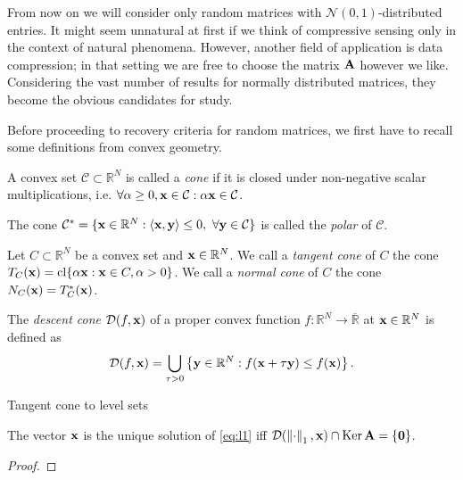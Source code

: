 From now on we will consider only random matrices with $\mathcal{N}(0,1)$-distributed entries.
It might seem unnatural at first if we think of compressive sensing only in the context of natural phenomena.
However, another field of application is data compression; in that setting we are free to choose the matrix $\mathbf{A}$ however we like.
Considering the vast number of results for normally distributed matrices, they become the obvious candidates for study.

Before proceeding to recovery criteria for random matrices, we first have to recall some definitions from convex geometry.

\begin{definition}
    A convex set $\mathcal{C} \subset \mathbb{R}^N$ is called a \textit{cone} if it is closed under non-negative scalar multiplications, i.e.
    $\forall \alpha \geq 0, \mathbf{x} \in \mathcal{C}: \alpha \mathbf{x} \in \mathcal{C}$.

    The cone $\mathcal{C}^* = \{ \mathbf{x} \in \mathbb{R}^N : \left< \mathbf{x}, \mathbf{y} \right> \leq 0, \ \forall \mathbf{y} \in \mathcal{C} \}$
    is called the \textit{polar} of $\mathcal{C}$.
\end{definition}

\begin{definition}
    Let $C \subset \mathbb{R}^N$ be a convex set and $\mathbf{x} \in \mathbb{R}^N$.
    We call a \textit{tangent cone} of $C$ the cone $T_C(\mathbf{x}) = \operatorname{cl}\{\alpha\mathbf{x}: \mathbf{x} \in C, \alpha > 0  \} $.
    We call a \textit{normal cone} of $C$ the cone $N_C(\mathbf{x}) = T_C^*(\mathbf{x})$.
\end{definition}

\begin{definition}
    The \textit{descent cone} $\mathcal{D}(f, \mathbf{x}) $ of a proper convex function $f: \mathbb{R}^N \rightarrow \overline{\mathbb{R}}$
    at $\mathbf{x} \in \mathbb{R}^N$ is defined as $$\mathcal{D}(f, \mathbf{x}) = \bigcup_{\tau > 0} \left\{ \mathbf{y} \in \mathbb{R}^N: f(\mathbf{x}+\tau \mathbf{y}) \leq f(\mathbf{x}) \right\}. $$
\end{definition}

\begin{remark}
    Tangent cone to level sets
\end{remark}

\begin{proposition}
    The vector $\mathbf{x}$ is the unique solution of \ref{eq:l1} iff $\mathcal{D}(\left\Vert\cdot\right\Vert_1, \mathbf{x}) \cap \operatorname{Ker} \mathbf{A} = \{\mathbf{0}\}$.
\end{proposition}

\begin{proof}

\end{proof}

